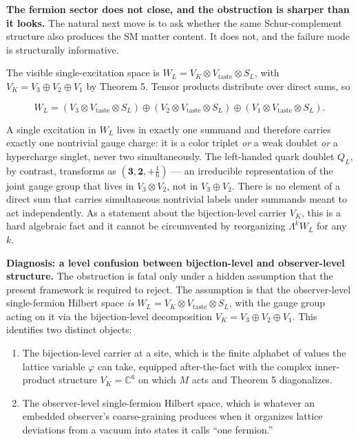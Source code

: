 \documentclass[
]{article}
\begin{document}
\textbf{The fermion sector does not close, and the obstruction is
sharper than it looks.} The natural next move is to ask whether the same
Schur-complement structure also produces the SM matter content. It does
not, and the failure mode is structurally informative.

The visible single-excitation space is
\(W_L = V_K \otimes V_{\text{taste}} \otimes S_L\), with
\(V_K = V_3 \oplus V_2 \oplus V_1\) by Theorem 5. Tensor products
distribute over direct sums, so

\[W_L = (V_3 \otimes V_{\text{taste}} \otimes S_L) \oplus (V_2 \otimes V_{\text{taste}} \otimes S_L) \oplus (V_1 \otimes V_{\text{taste}} \otimes S_L).\]

A single excitation in \(W_L\) lives in exactly one summand and
therefore carries exactly one nontrivial gauge charge: it is a color
triplet \emph{or} a weak doublet \emph{or} a hypercharge singlet, never
two simultaneously. The left-handed quark doublet \(Q_L\), by contrast,
transforms as \((\mathbf{3}, \mathbf{2}, +\tfrac{1}{6})\) --- an
irreducible representation of the joint gauge group that lives in
\(V_3 \otimes V_2\), not in \(V_3 \oplus V_2\). There is no element of a
direct sum that carries simultaneous nontrivial labels under summands
meant to act independently. As a statement about the bijection-level
carrier \(V_K\), this is a hard algebraic fact and it cannot be
circumvented by reorganizing \(\Lambda^k W_L\) for any \(k\).

\textbf{Diagnosis: a level confusion between bijection-level and
observer-level structure.} The obstruction is fatal only under a hidden
assumption that the present framework is required to reject. The
assumption is that the observer-level single-fermion Hilbert space
\emph{is} \(W_L = V_K \otimes V_{\text{taste}} \otimes S_L\), with the
gauge group acting on it via the bijection-level decomposition
\(V_K = V_3 \oplus V_2 \oplus V_1\). This identifies two distinct
objects:

\begin{enumerate}
\def\labelenumi{\arabic{enumi}.}
\item
  The bijection-level carrier at a site, which is the finite alphabet of
  values the lattice variable \(\varphi\) can take, equipped
  after-the-fact with the complex inner-product structure
  \(V_K = \mathbb{C}^6\) on which \(M\) acts and Theorem 5 diagonalizes.
\item
  The observer-level single-fermion Hilbert space, which is whatever an
  embedded observer's coarse-graining produces when it organizes lattice
  deviations from a vacuum into states it calls ``one fermion.''
\end{enumerate}
\end{document}
